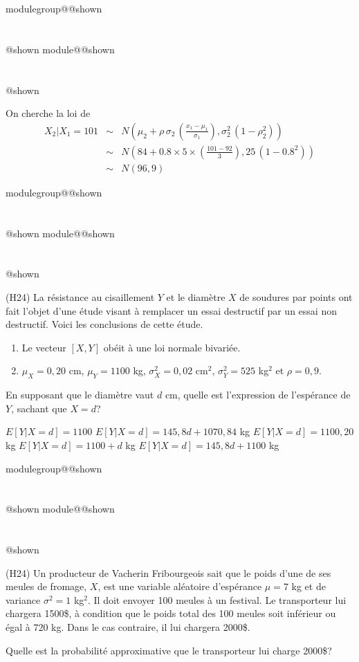 \documentclass{Evaluation}
\makeatletter
\newcommand{\currentmodulekey}{}
\newcommand{\currentmoduletitle}{}
\newcommand{\currentgroupkey}{}
\newcommand{\currentgrouptitle}{}
\newcommand{\showmoduleifneeded}{%
  \ifx\currentgroupkey\empty\else
    \expandafter\ifx\csname modulegroup@\currentgroupkey @shown\endcsname\relax
      \section*{\currentgrouptitle}%
      \expandafter\gdef\csname modulegroup@\currentgroupkey @shown\endcsname{1}%
    \fi
  \fi
  \expandafter\ifx\csname module@\currentmodulekey @shown\endcsname\relax
    \section*{\currentmoduletitle}%
    \expandafter\gdef\csname module@\currentmodulekey @shown\endcsname{1}%
  \fi
}
\newenvironment{H23}{\showmoduleifneeded}{}
\newenvironment{H24}{\showmoduleifneeded}{}
\makeatother
\begin{document}
\begin{questions}
\begin{H23}
\begin{solution}
On cherche la loi de
		\begin{eqnarray*}
			{X}_2|{X}_1=101 &\sim& N\left(\mu_2 +\rho\, \sigma_2\, \left(\frac{x_1-\mu_1}{\sigma_1}\right),\sigma_2^2 \,\left(1-\rho_2^2\right)\right)\\
			&\sim& N\left(84 +0.8\times 5\times \left(\frac{101-92}{3}\right),25 \,\left(1-0.8^2\right)\right)\\
			&\sim& N\left(96, 9 \right)
	\end{eqnarray*}
\end{solution}
\end{H23}

\begin{H24}
\question
(H24)
La résistance au cisaillement $Y$ et le diamètre $X$ de soudures par points ont fait l'objet d'une étude visant à remplacer un essai destructif par un essai non destructif. Voici les conclusions de cette étude.
\begin{enumerate}
    \item Le vecteur $[X,Y]$ obéit à une loi normale bivariée.
    \item $\mu_X=0,20$ cm, $\mu_Y=1100$ kg, $\sigma^2_X=0,02$ cm$^2$, $\sigma^2_Y=525$ kg$^2$ et $\rho = 0,9$.
\end{enumerate}

En supposant que le diamètre vaut $d$ cm, quelle est l'expression de l'espérance de $Y$, sachant que $X=d$?

 \begin{checkboxes}
		\choice $E[Y|X=d]=1100$  %
		\correctchoice $E[Y|X=d]=145,8d + 1070,84$ kg %
		\choice $E[Y|X=d]=1100,20$ kg %
		\choice $E[Y|X=d]=1100+d$ kg%
		\choice $E[Y|X=d]=145,8d + 1100$ kg%
\end{checkboxes}

\vspace{0.5cm}
\end{H24}

\begin{H24}
\question
(H24)
Un producteur de Vacherin Fribourgeois sait que le poids d'une de ses meules de fromage, $X$, est une variable aléatoire d'espérance $\mu=7$ kg et de variance $\sigma^2 = 1$ kg$^2$. Il doit envoyer 100 meules à un festival. Le transporteur lui chargera 1500\$, à condition que le poids total des 100 meules soit inférieur ou égal à $720$ kg. Dans le cas contraire, il lui chargera 2000\$.

Quelle est la probabilité approximative que le transporteur lui charge 2000\$?
    \vspace{12cm}
\end{H24}


\end{questions}
\end{document}
